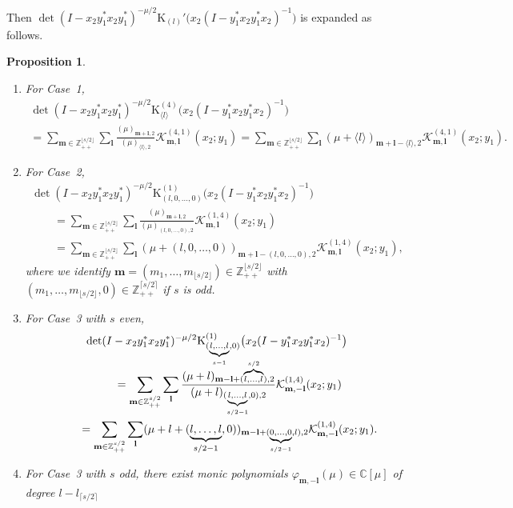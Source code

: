 \documentclass[pdftex]{sigma}
\numberwithin{equation}{section}
\newtheorem{Proposition}[Theorem]{Proposition}
{ \theoremstyle{definition}
\newtheorem{Definition}[Theorem]{Definition}
\newtheorem{Note}[Theorem]{Note}
\newtheorem{Example}[Theorem]{Example}
\newtheorem{Remark}[Theorem]{Remark} }
\newcommand{\bl}{\mathbf{l}}
\newcommand{\bm}{\mathbf{m}}
\newcommand{\BZ}{\mathbb{Z}}
\newcommand{\BC}{\mathbb{C}}
\newcommand{\cK}{\mathcal{K}}
\newcommand{\rK}{\mathrm{K}}
\begin{document}
Then $\det(I-x_2y_1^*x_2y_1^*)^{-\mu/2}\rK_{(l)}'\big(x_2(I-y_1^*x_2y_1^*x_2)^{-1}\big)$ is expanded as follows.
\begin{Proposition}\label{exp_susp}\quad
\begin{enumerate}\itemsep=0pt
\item[$(1)$] For Case~{\rm 1},
\begin{gather*}
 \det(I-x_2y_1^*x_2y_1^*)^{-\mu/2}\rK_{\langle l\rangle}^{(4)}\big(x_2(I-y_1^*x_2y_1^*x_2)^{-1}\big)\\
 =\sum_{\bm\in\BZ_{++}^{\lfloor s/2\rfloor}}\sum_\bl \frac{(\mu)_{\bm+\bl,2}}{(\mu)_{\langle l\rangle,2}}\cK_{\bm,\bl}^{(4,1)}(x_2;y_1)
=\sum_{\bm\in\BZ_{++}^{\lfloor s/2\rfloor}}\sum_\bl (\mu+\langle l\rangle)_{\bm+\bl-\langle l\rangle,2}\cK_{\bm,\bl}^{(4,1)}(x_2;y_1).
\end{gather*}
\item[$(2)$] For Case~{\rm 2},
\begin{gather*}
 \det(I-x_2y_1^*x_2y_1^*)^{-\mu/2}\rK_{(l,0,\ldots,0)}^{(1)}\big(x_2(I-y_1^*x_2y_1^*x_2)^{-1}\big)\\
 \qquad{}=\sum_{\bm\in\BZ_{++}^{\lfloor s/2\rfloor}}\sum_\bl \frac{(\mu)_{\bm+\bl,2}}{(\mu)_{(l,0,\ldots,0),2}}\cK_{\bm,\bl}^{(1,4)}(x_2;y_1)\\
 \qquad{} =\sum_{\bm\in\BZ_{++}^{\lfloor s/2\rfloor}}\sum_\bl (\mu+(l,0,\ldots,0))_{\bm+\bl-(l,0,\ldots,0),2}\cK_{\bm,\bl}^{(1,4)}(x_2;y_1),
\end{gather*}
where we identify $\bm=(m_1,\ldots,m_{\lfloor s/2\rfloor})\in\BZ_{++}^{\lfloor s/2\rfloor}$ with
$(m_1,\ldots,m_{\lfloor s/2\rfloor},0)\in\BZ_{++}^{\lceil s/2\rceil}$ if $s$ is odd.
\item[$(3)$] For Case~{\rm 3} with $s$ even,
\begin{gather*}
 \det(I-x_2y_1^*x_2y_1^*)^{-\mu/2}\rK_{(\underbrace{\scriptstyle l,\ldots,l}_{s-1},0)}^{(1)}\big(x_2(I-y_1^*x_2y_1^*x_2)^{-1}\big)\\
\qquad{} =\sum_{\bm\in\BZ_{++}^{s/2}}\sum_\bl \frac{(\mu+l)_{\bm-\bl+(\smash{\overbrace{\scriptstyle l,\ldots,l}^{s/2}}),2}}
{(\mu+l)_{(\underbrace{\scriptstyle l,\ldots,l}_{s/2-1},0),2}}\cK_{\bm,-\bl}^{(1,4)}(x_2;y_1)\\
\qquad{} =\sum_{\bm\in\BZ_{++}^{s/2}}\sum_\bl (\mu+l+(\underbrace{l,\ldots,l}_{s/2-1},0))_{\bm-\bl+(\underbrace{\scriptstyle 0,\ldots,0}_{s/2-1},l),2}
\cK_{\bm,-\bl}^{(1,4)}(x_2;y_1).
\end{gather*}
\item[$(4)$] For Case~{\rm 3} with $s$ odd, there exist monic polynomials $\varphi_{\bm,-\bl}(\mu)\in\BC[\mu]$ of degree $l-l_{\lceil s/2\rceil}$

\end{enumerate}
\end{Proposition}
\end{document}
